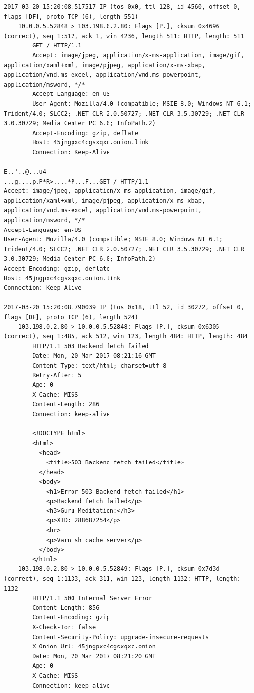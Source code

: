 \documentclass[11pt]{diazessay} %
\begin{document}
\begin{lstlisting}
2017-03-20 15:20:08.517517 IP (tos 0x0, ttl 128, id 4560, offset 0, flags [DF], proto TCP (6), length 551)
    10.0.0.5.52848 > 103.198.0.2.80: Flags [P.], cksum 0x4696 (correct), seq 1:512, ack 1, win 4236, length 511: HTTP, length: 511
        GET / HTTP/1.1
        Accept: image/jpeg, application/x-ms-application, image/gif, application/xaml+xml, image/pjpeg, application/x-ms-xbap, application/vnd.ms-excel, application/vnd.ms-powerpoint, application/msword, */*
        Accept-Language: en-US
        User-Agent: Mozilla/4.0 (compatible; MSIE 8.0; Windows NT 6.1; Trident/4.0; SLCC2; .NET CLR 2.0.50727; .NET CLR 3.5.30729; .NET CLR 3.0.30729; Media Center PC 6.0; InfoPath.2)
        Accept-Encoding: gzip, deflate
        Host: 45jngpxc4cgsxqxc.onion.link
        Connection: Keep-Alive

E..'..@...u4
...g....p.P*R>....*P...F...GET / HTTP/1.1
Accept: image/jpeg, application/x-ms-application, image/gif, application/xaml+xml, image/pjpeg, application/x-ms-xbap, application/vnd.ms-excel, application/vnd.ms-powerpoint, application/msword, */*
Accept-Language: en-US
User-Agent: Mozilla/4.0 (compatible; MSIE 8.0; Windows NT 6.1; Trident/4.0; SLCC2; .NET CLR 2.0.50727; .NET CLR 3.5.30729; .NET CLR 3.0.30729; Media Center PC 6.0; InfoPath.2)
Accept-Encoding: gzip, deflate
Host: 45jngpxc4cgsxqxc.onion.link
Connection: Keep-Alive

2017-03-20 15:20:08.790039 IP (tos 0x18, ttl 52, id 30272, offset 0, flags [DF], proto TCP (6), length 524)
    103.198.0.2.80 > 10.0.0.5.52848: Flags [P.], cksum 0x6305 (correct), seq 1:485, ack 512, win 123, length 484: HTTP, length: 484
        HTTP/1.1 503 Backend fetch failed
        Date: Mon, 20 Mar 2017 08:21:16 GMT
        Content-Type: text/html; charset=utf-8
        Retry-After: 5
        Age: 0
        X-Cache: MISS
        Content-Length: 286
        Connection: keep-alive

        <!DOCTYPE html>
        <html>
          <head>
            <title>503 Backend fetch failed</title>
          </head>
          <body>
            <h1>Error 503 Backend fetch failed</h1>
            <p>Backend fetch failed</p>
            <h3>Guru Meditation:</h3>
            <p>XID: 288687254</p>
            <hr>
            <p>Varnish cache server</p>
          </body>
        </html>
    103.198.0.2.80 > 10.0.0.5.52849: Flags [P.], cksum 0x7d3d (correct), seq 1:1133, ack 311, win 123, length 1132: HTTP, length: 1132
        HTTP/1.1 500 Internal Server Error
        Content-Length: 856
        Content-Encoding: gzip
        X-Check-Tor: false
        Content-Security-Policy: upgrade-insecure-requests
        X-Onion-Url: 45jngpxc4cgsxqxc.onion
        Date: Mon, 20 Mar 2017 08:21:20 GMT
        Age: 0
        X-Cache: MISS
        Connection: keep-alive


\end{lstlisting}
\end{document}
